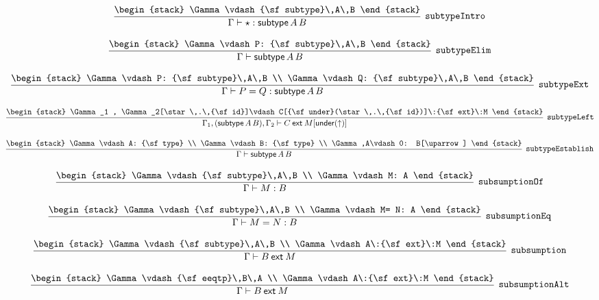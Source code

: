 \[
\infer[{\tt subtypeIntro}]{\Gamma \vdash \star : {\sf subtype}\,A\,B}{
\begin{stack}
\Gamma \vdash {\sf subtype}\,A\,B
\end{stack}}
\]

\[
\infer[{\tt subtypeElim}]{\Gamma \vdash {\sf subtype}\,A\,B}{
\begin{stack}
\Gamma \vdash P: {\sf subtype}\,A\,B
\end{stack}}
\]

\[
\infer[{\tt subtypeExt}]{\Gamma \vdash P= Q: {\sf subtype}\,A\,B}{
\begin{stack}
\Gamma \vdash P: {\sf subtype}\,A\,B
\\
\Gamma \vdash Q: {\sf subtype}\,A\,B
\end{stack}}
\]

\[
\infer[{\tt subtypeLeft}]{\Gamma_1 ,({\sf subtype}\,A\,B), \Gamma_2 \vdash C\:{\sf ext}\:M[{\sf under}(\uparrow )]}{
\begin{stack}
\Gamma_1 , \Gamma_2[\star \,.\,{\sf id}]\vdash C[{\sf under}(\star \,.\,{\sf id})]\:{\sf ext}\:M
\end{stack}}
\]

\[
\infer[{\tt subtypeEstablish}]{\Gamma \vdash {\sf subtype}\,A\,B}{
\begin{stack}
\Gamma \vdash A: {\sf type}
\\
\Gamma \vdash B: {\sf type}
\\
\Gamma ,A\vdash 0: B[\uparrow ]
\end{stack}}
\]

\[
\infer[{\tt subsumptionOf}]{\Gamma \vdash M: B}{
\begin{stack}
\Gamma \vdash {\sf subtype}\,A\,B
\\
\Gamma \vdash M: A
\end{stack}}
\]

\[
\infer[{\tt subsumptionEq}]{\Gamma \vdash M= N: B}{
\begin{stack}
\Gamma \vdash {\sf subtype}\,A\,B
\\
\Gamma \vdash M= N: A
\end{stack}}
\]

\[
\infer[{\tt subsumption}]{\Gamma \vdash B\:{\sf ext}\:M}{
\begin{stack}
\Gamma \vdash {\sf subtype}\,A\,B
\\
\Gamma \vdash A\:{\sf ext}\:M
\end{stack}}
\]

\[
\infer[{\tt subsumptionAlt}]{\Gamma \vdash B\:{\sf ext}\:M}{
\begin{stack}
\Gamma \vdash {\sf eeqtp}\,B\,A
\\
\Gamma \vdash A\:{\sf ext}\:M
\end{stack}}
\]

